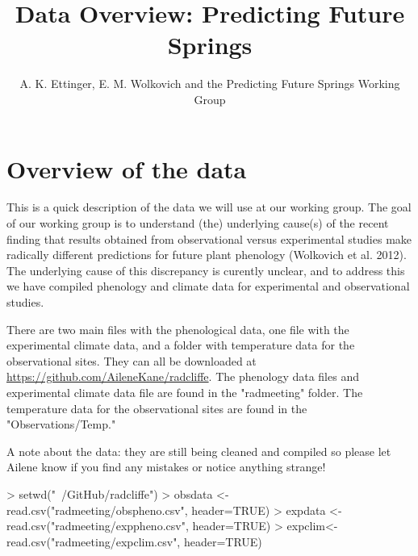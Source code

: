 \documentclass{article}
\begin{document}
% 
\title{Data Overview: Predicting Future Springs} %
\author{A. K. Ettinger, E. M. Wolkovich and the Predicting Future Springs Working Group}
\maketitle  %
\section {Overview of the data}

This is a quick description of the data we will use at our working group. The goal of our working group is to understand (the) underlying cause(s) of the recent finding that results obtained from observational versus experimental studies make radically different predictions for future plant phenology (Wolkovich et al. 2012). The underlying cause of this discrepancy is curently unclear, and to address this we have compiled phenology and climate data for experimental and observational studies. 

There are two main files with the phenological data, one file with the experimental climate data, and a folder with temperature data for the observational sites. They can all be downloaded at \url{https://github.com/AileneKane/radcliffe}. The phenology data files and experimental climate data file are found in the "radmeeting" folder. The temperature data for the observational sites are found in the "Observations/Temp."

A note about the data: they are still being cleaned and compiled so please let Ailene know if you find any mistakes or notice anything strange! 

\begin{Schunk}
\begin{Sinput}
> setwd("~/GitHub/radcliffe")
> obsdata <- read.csv("radmeeting/obspheno.csv", header=TRUE)
> expdata <- read.csv("radmeeting/exppheno.csv", header=TRUE)
> expclim<-read.csv("radmeeting/expclim.csv", header=TRUE)
\end{Sinput}
\end{Schunk}
\end{document}
